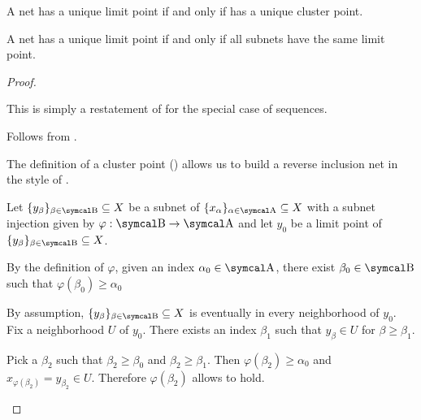 \begin{proposition}
\begin{proposition}
\begin{propenum}
     A net has a unique limit point if and only if has a unique cluster point.

     A net has a unique limit point if and only if all subnets have the same limit point.
  \end{propenum}
\end{proposition}
\begin{proof}\mbox{}
  \begin{description}
     This is simply a restatement of  for the special case of sequences.

     Follows from .

    \mbox{}
    \begin{description}
      \Implies The definition of a cluster point () allows us to build a reverse inclusion net in the style of .

      \ImpliedBy Let \( \{ y_\beta \}_{\beta \in \CB} \subseteq X \) be a subnet of \( \{ x_\al \}_{\al \in \CA} \subseteq X \) with a subnet injection given by \( \varphi: \CB \to \CA \) and let \( y_0 \) be a limit point of \( \{ y_\beta \}_{\beta \in \CB} \subseteq X \).

      By the definition of \( \varphi \), given an index \( \alpha_0 \in \CA \), there exist \( \beta_0 \in \CB \) such that \( \varphi(\beta_0) \geq \alpha_0 \)

      By assumption, \( \{ y_\beta \}_{\beta \in \CB} \subseteq X \) is eventually in every neighborhood of \( y_0 \). Fix a neighborhood \( U \) of \( y_0 \). There exists an index \( \beta_1 \) such that \( y_\beta \in U \) for \( \beta \geq \beta_1 \).

      Pick a \( \beta_2 \) such that \( \beta_2 \geq \beta_0 \) and \( \beta_2 \geq \beta_1 \). Then \( \varphi(\beta_2) \geq \alpha_0 \) and \( x_{\varphi(\beta_2)} = y_{\beta_2} \in U \). Therefore \( \varphi(\beta_2) \) allows  to hold.
    \end{description}


\end{description}
\end{proof}
\end{proposition}
